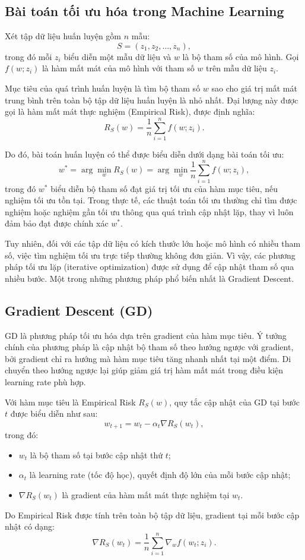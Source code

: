 \subsection{Bài toán tối ưu hóa trong Machine Learning}

Xét tập dữ liệu huấn luyện gồm $n$ mẫu:
\[
S = (z_1, z_2, \ldots, z_n),
\]
trong đó mỗi $z_i$ biểu diễn một mẫu dữ liệu và $w$ là bộ tham số của mô hình. Gọi $f(w; z_i)$ là hàm mất mát của mô hình với tham số $w$ trên mẫu dữ liệu $z_i$.

Mục tiêu của quá trình huấn luyện là tìm bộ tham số $w$ sao cho giá trị mất mát trung bình trên toàn bộ tập dữ liệu huấn luyện là nhỏ nhất. Đại lượng này được gọi là hàm mất mát thực nghiệm (Empirical Risk), được định nghĩa:
\[
R_S(w) = \frac{1}{n}\sum_{i=1}^{n} f(w; z_i).
\]

Do đó, bài toán huấn luyện có thể được biểu diễn dưới dạng bài toán tối ưu:
\[
w^\ast = \arg\min_w R_S(w) = \arg\min_w \frac{1}{n}\sum_{i=1}^{n} f(w; z_i),
\]
trong đó $w^\ast$ biểu diễn bộ tham số đạt giá trị tối ưu của hàm mục tiêu, nếu nghiệm tối ưu tồn tại. Trong thực tế, các thuật toán tối ưu thường chỉ tìm được nghiệm hoặc nghiệm gần tối ưu thông qua quá trình cập nhật lặp, thay vì luôn đảm bảo đạt được chính xác $w^\ast$.

Tuy nhiên, đối với các tập dữ liệu có kích thước lớn hoặc mô hình có nhiều tham số, việc tìm nghiệm tối ưu trực tiếp thường không đơn giản. Vì vậy, các phương pháp tối ưu lặp (iterative optimization) được sử dụng để cập nhật tham số qua nhiều bước. Một trong những phương pháp phổ biến nhất là Gradient Descent.

\subsection{Gradient Descent (GD)}

\ac{GD} là phương pháp tối ưu hóa dựa trên gradient của hàm mục tiêu. Ý tưởng chính của phương pháp là cập nhật bộ tham số theo hướng ngược với gradient, bởi gradient chỉ ra hướng mà hàm mục tiêu tăng nhanh nhất tại một điểm. Di chuyển theo hướng ngược lại giúp giảm giá trị hàm mất mát trong điều kiện learning rate phù hợp.

Với hàm mục tiêu là Empirical Risk $R_S(w)$, quy tắc cập nhật của GD tại bước $t$ được biểu diễn như sau:
\[
w_{t+1} = w_t - \alpha_t \nabla R_S(w_t),
\]
trong đó:
\begin{itemize}
    \item $w_t$ là bộ tham số tại bước cập nhật thứ $t$;
    \item $\alpha_t$ là learning rate (tốc độ học), quyết định độ lớn của mỗi bước cập nhật;
    \item $\nabla R_S(w_t)$ là gradient của hàm mất mát thực nghiệm tại $w_t$.
\end{itemize}
Do Empirical Risk được tính trên toàn bộ tập dữ liệu, gradient tại mỗi bước cập nhật có dạng:
\[
\nabla R_S(w_t) = \frac{1}{n}\sum_{i=1}^{n} \nabla_w f(w_t; z_i).
\]

